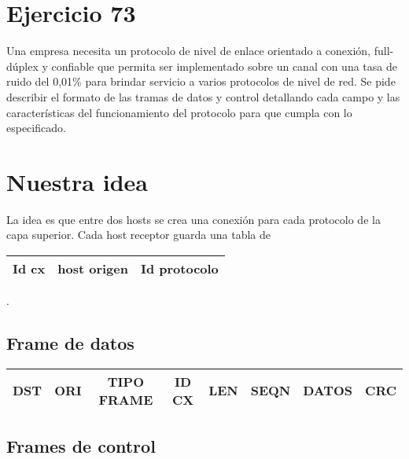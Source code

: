 \documentclass[a4paper,10pt]{article}
\begin{document}
\section*{Ejercicio 73}
   Una empresa necesita un protocolo de nivel de enlace orientado a conexión, full-dúplex y confiable que 
   permita ser implementado sobre un canal con una tasa de ruido del 0,01\% para brindar servicio a varios 
   protocolos de nivel de red. Se pide describir el formato de las tramas de datos y control detallando 
   cada campo y las características del funcionamiento del protocolo para que cumpla con lo especificado.

\section*{Nuestra idea}

La idea es que entre dos hosts se crea una conexión para cada protocolo de la capa superior.  Cada host receptor guarda una tabla de 
\begin{tabular}{|c|c|c|}\hline
Id cx &host origen &Id protocolo\\\hline
\end{tabular}.

\subsection*{Frame de datos}

\begin{tabular}{|c|c|c|c|c|c|c|c|}\hline
	DST & ORI & TIPO FRAME & ID CX & LEN & SEQN & DATOS & CRC \\ \hline
\end{tabular}

\subsection*{Frames de control}
\end{document}
